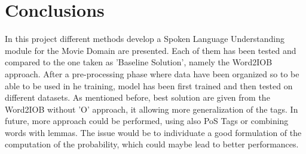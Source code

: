 \documentclass[11pt,a4paper]{article}
\begin{document}
\section{Conclusions}

In this project different methods develop a Spoken Language Understanding module for the Movie Domain are presented. Each of them has been tested and compared to the one taken as 'Baseline Solution', namely the Word2IOB approach. After a pre-processing phase where data have been organized so to be able to be used in he training, model has been first trained and then tested on different datasets. As mentioned before, best solution are given from the Word2IOB without 'O' approach, it allowing more generalization of the tags. In future, more approach could be performed, using also PoS Tags or combining words with lemmas. The issue would be to individuate a good formulation of the computation of the probability, which could maybe lead to better performances.


%
%


\end{document}
